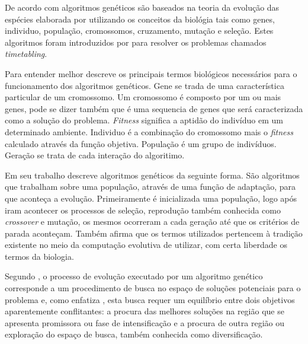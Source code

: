 \documentclass{abntpuc}
\begin{document}
%
%
%


%
%
%



De acordo com \cite{goldberg1989genetic} algoritmos genéticos são baseados na teoria da evolução das espécies elaborada por \cite{darwin1968origin} utilizando os conceitos da biológia tais como genes, individuo, população, cromossomos, cruzamento, mutação e seleção. Estes algoritmos foram introduzidos por \cite{holland1975adaptation} para resolver os problemas chamados \textit{timetabling}.

Para entender melhor \cite{mitchell1998introduction} descreve os principais termos biológicos necessários para o funcionamento dos algoritmos genéticos. Gene se trada de uma característica particular de um cromossomo. Um cromossomo é composto por um ou mais genes, pode se dizer também que é uma sequencia de genes que será caracterizada como a solução do problema. \textit{Fitness} significa a aptidão do indivíduo em um determinado ambiente. Individuo é a combinação do cromossomo mais o \textit{fitness} calculado através da função objetiva. População é um grupo de indivíduos. Geração se trata de cada interação do algoritimo.\par

Em seu trabalho \cite{lucas2000algoritmos} descreve algoritmos genéticos da seguinte forma. São algoritmos que trabalham sobre uma população, através de uma função de adaptação, para que aconteça a evolução. Primeiramente é inicializada uma população, logo após iram acontecer os processos de seleção, reprodução também conhecida como \textit{crossover} e mutação, os mesmos ocorreram a cada geração até que os critérios de parada aconteçam. Também afirma que os termos utilizados pertencem à tradição existente no meio da computação evolutiva de utilizar, com certa liberdade os termos da biologia.

Segundo \cite{oliveira2005algoritmo}, o processo de evolução executado por um algoritmo genético corresponde a um procedimento de busca no espaço de soluções potenciais para o problema e, como enfatiza \cite{michalewicz1996evolutionary}, esta busca requer um equilíbrio entre dois objetivos aparentemente conflitantes: a procura das melhores soluções na região que se apresenta promissora ou fase de intensificação e a procura de outra região ou exploração do espaço de busca, também conhecida como diversificação.\par
\end{document}
